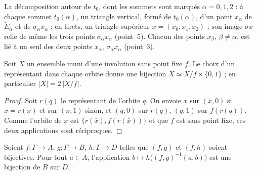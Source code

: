 La décomposition autour de $t_0$, dont les sommets sont marqués $\alpha = 0, 1, 2$ : à chaque sommet $t_0(\alpha)$, un triangle vertical, formé de $t_0(\alpha)$, d'un point $x_\alpha$ de $\widetilde E_\alpha$ et de $\sigma_\alpha x_\alpha$ ; en tirets, un triangle supérieur $x = (x_0, x_1, x_2)$ ; son image $\sigma x$ relie de même les trois points $\sigma_\alpha x_\alpha$ (point~5). Chacun des points $x_\beta$, $\beta \neq \alpha$, est lié à un seul des deux points $x_\alpha$, $\sigma_\alpha x_\alpha$ (point~3).
\begin{center}
\end{center}

\begin{lemme}\label{lem:74-revetement}
Soit $X$ un ensemble muni d'une involution sans point fixe $f$. Le choix d'un représentant dans chaque orbite donne une bijection $X \simeq X/f \times \{0, 1\}$ ; en particulier $|X| = 2\,|X/f|$.
\end{lemme}

\begin{proof}
Soit $r(q)$ le représentant de l'orbite $q$. On envoie $x$ sur $(\bar x, 0)$ si $x = r(\bar x)$ et sur $(\bar x, 1)$ sinon, et $(q, 0)$ sur $r(q)$, $(q, 1)$ sur $f(r(q))$. Comme l'orbite de $x$ est $\{r(\bar x), f(r(\bar x))\}$ et que $f$ est sans point fixe, ces deux applications sont réciproques.
\end{proof}

\begin{lemme}\label{lem:74-ligne}
Soient $f : \Gamma \to A$, $g : \Gamma \to B$, $h : \Gamma \to D$ telles que $(f, g)$ et $(f, h)$ soient bijectives. Pour tout $a \in A$, l'application $b \mapsto h\bigl((f, g)^{-1}(a, b)\bigr)$ est une bijection de $B$ sur $D$.
\end{lemme}

